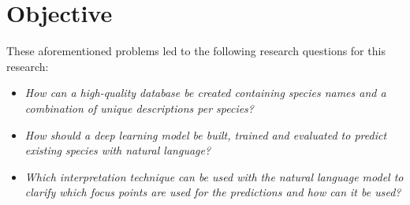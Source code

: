 \documentclass[a4paper, 12pt, oneside]{book} %
\begin{document}

\section{Objective}
These aforementioned problems led to the following research questions for this research:
\noindent 
\begin{itemize}
    
    \item \emph{How can a high-quality database be created containing species names and a combination of unique descriptions per species?}
    
    \item \emph{How should a deep learning model be built, trained and evaluated to predict existing species with natural language?}

    \item \emph{Which interpretation technique can be used with the natural language model to clarify which focus points are used for the predictions and how can it be used?}

\end{itemize}
\end{document}
